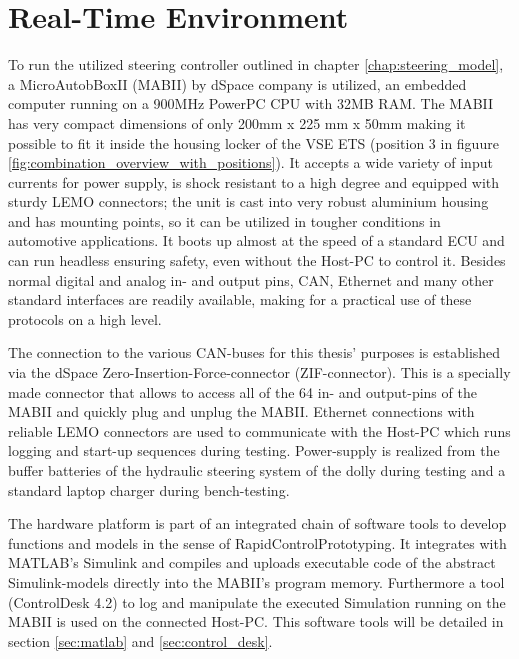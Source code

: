 \documentclass[ExampleMasters.tex]{subfiles}
\begin{document}
\section{Real-Time Environment}
\label{sec:realtime_environment}

To run the utilized steering controller outlined in chapter \ref{chap:steering_model}, a MicroAutobBoxII (MABII) by dSpace company is utilized, an embedded computer running on a 900MHz PowerPC CPU with 32MB RAM. The MABII has very compact dimensions of only 200mm x 225 mm x 50mm making it possible to fit it inside the housing locker of the VSE ETS (position 3 in figuure \ref{fig:combination_overview_with_positions}). It accepts a wide variety of input currents for power supply, is shock resistant to a high degree and equipped with sturdy LEMO connectors; the unit is cast into very robust aluminium housing and has mounting points, so it can be utilized in tougher conditions in automotive applications. It boots up almost at the speed of a standard ECU and can run headless ensuring safety, even without the Host-PC to control it. Besides normal digital and analog in- and output pins, CAN, Ethernet and many other standard interfaces are readily available, making for a practical use of these protocols on a high level. 

The connection to the various CAN-buses for this thesis' purposes is established via the dSpace Zero-Insertion-Force-connector (ZIF-connector). This is a specially made connector that allows to access all of the 64 in- and output-pins of the MABII and quickly plug and unplug the MABII. Ethernet connections with reliable LEMO connectors are used to communicate with the Host-PC which runs logging and start-up sequences during testing. Power-supply is realized from the buffer batteries of the hydraulic steering system of the dolly during testing and a standard laptop charger during bench-testing.

The hardware platform is part of an integrated chain of software tools to develop functions and models in the sense of RapidControlPrototyping. It integrates with MATLAB's Simulink and compiles and uploads executable code of the abstract Simulink-models directly into the MABII's program memory. Furthermore a tool (ControlDesk 4.2) to log and manipulate the executed Simulation running on the MABII is used on the connected Host-PC. This software tools will be detailed in section \ref{sec:matlab} and \ref{sec:control_desk}.\cite{MABII_product_descr}
\end{document}
